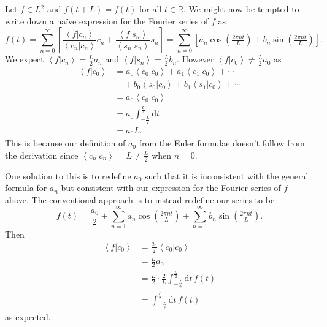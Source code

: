 \documentclass[11pt, a4paper]{article}
\renewcommand{\d}{\ensuremath{\mathrm{d}}}
\newcommand{\braket}[2]{\left\langle #1 \!\left| #2 \right\rangle\right.}
\begin{document}
Let $f \in L\!^2$ and $f(t + L) = f(t)$ for all $t \in \mathbb{R}$. We might now be tempted to write down a na\"ive expression for the Fourier series of $f$ as
\[
f(t) = \sum_{n=0}^\infty \left[ \frac{\braket{f}{c_n}}{\braket{c_n}{c_n}}c_n + \frac{\braket{f}{s_n}}{\braket{s_n}{s_n}}s_n \right] 
    = \sum_{n=0}^\infty \left[ a_n \cos\left(\tfrac{2\pi n t}{L}\right) + b_n \sin\left(\tfrac{2\pi n t}{L}\right) \right].
\]
We expect $\braket{f}{c_n} = \frac{L}{2} a_n$ and $\braket{f}{s_n} = \frac{L}{2} b_n$. However $\braket{f}{c_0} \neq \frac{L}{2} a_0$ as
\begin{align*}
\braket{f}{c_0} &= a_0 \braket{c_0}{c_0} + a_1 \braket{c_1}{c_0} + \cdots \\
    &\quad + b_0 \braket{s_0}{c_0} + b_1\braket{s_1}{c_0} + \cdots\\
    &= a_0 \braket{c_0}{c_0} \\
    &= a_0 \int_{-\frac{L}{2}}^\frac{L}{2} \d t \\
    &= a_0 L.
\end{align*}
This is because our definition of $a_0$ from the Euler formulae doesn't follow from the derivation since $\braket{c_n}{c_n} = L \neq \frac{L}{2}$ when $n = 0$. 

One solution to this is to redefine $a_0$ such that it is inconsistent with the general formula for $a_n$ but consistent with our expression for the Fourier series of $f$ above. The conventional approach is to instead redefine our series to be
\[
f(t) = \frac{a_0}{2} + \sum_{n=1}^\infty a_n \cos\left(\tfrac{2\pi n t}{L}\right) + \sum_{n=1}^\infty b_n \sin\left(\tfrac{2\pi n t}{L}\right).
\]
Then
\begin{align*}
\braket{f}{c_0} &= \frac{a_0}{2} \braket{c_0}{c_0} \\
    &= \frac{L}{2} a_0 \\
    &= \frac{L}{2} \cdot \frac{2}{L} \int_{-\frac{L}{2}}^\frac{L}{2} \d t \, f(t) \\
    &= \int_{-\frac{L}{2}}^\frac{L}{2} \d t \, f(t)
\end{align*}
as expected.

\end{document}

